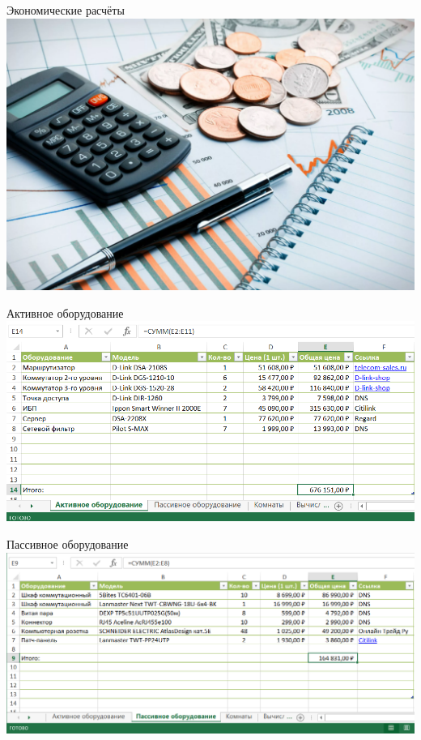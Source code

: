 \documentclass[aspectratio=169]{beamer}
\begin{document}
\begin{frame}{Экономические расчёты}
	\centering
	\includegraphics[width=0.7\linewidth]{images/Экономические расчёты.png}
\end{frame}

\begin{frame}{Активное оборудование}
	\centering
	\includegraphics[width=\linewidth]{images/Активное оборудование.png}
\end{frame}

\begin{frame}{Пассивное оборудование}
	\centering
	\includegraphics[width=\linewidth]{images/Пассивное оборудование.png}
\end{frame}
\end{document}
